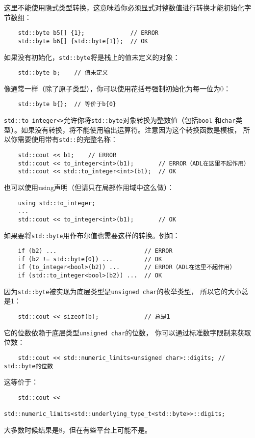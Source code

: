 这里不能使用隐式类型转换，这意味着你必须显式对整数值进行转换才能初始化字节数组：
\begin{lstlisting}
    std::byte b5[] {1};             // ERROR
    std::byte b6[] {std::byte{1}};  // OK
\end{lstlisting}
如果没有初始化，\texttt{std::byte}将是栈上的值未定义的对象：
\begin{lstlisting}
    std::byte b;    // 值未定义
\end{lstlisting}
像通常一样（除了原子类型），你可以使用花括号强制初始化为每一位为0：
\begin{lstlisting}
    std::byte b{};  // 等价于b{0}
\end{lstlisting}
\texttt{std::to\_integer<>}允许你将\texttt{std::byte}对象转换为整数值（包括\texttt{bool}
和\texttt{char}类型）。如果没有转换，将不能使用输出运算符。注意因为这个转换函数是模板，
所以你需要使用带有\texttt{std::}的完整名称：
\begin{lstlisting}
    std::cout << b1;    // ERROR
    std::cout << to_integer<int>(b1);       // ERROR（ADL在这里不起作用）
    std::cout << std::to_integer<int>(b1);  // OK
\end{lstlisting}
也可以使用using声明（但请只在局部作用域中这么做）：
\begin{lstlisting}
    using std::to_integer;
    ...
    std::cout << to_integer<int>(b1);       // OK
\end{lstlisting}
如果要将\texttt{std::byte}用作布尔值也需要这样的转换。例如：
\begin{lstlisting}
    if (b2) ...                         // ERROR
    if (b2 != std::byte{0}) ...         // OK
    if (to_integer<bool>(b2)) ...       // ERROR（ADL在这里不起作用）
    if (std::to_integer<bool>(b2)) ...  // OK
\end{lstlisting}
因为\texttt{std::byte}被实现为底层类型是\texttt{unsigned char}的枚举类型，
所以它的大小总是1：
\begin{lstlisting}
    std::cout << sizeof(b);             // 总是1
\end{lstlisting}
它的位数依赖于底层类型\texttt{unsigned char}的位数，
你可以通过标准数字限制来获取位数：
\begin{lstlisting}
    std::cout << std::numeric_limits<unsigned char>::digits; // std::byte的位数
\end{lstlisting}
这等价于：
\begin{lstlisting}
    std::cout <<
        std::numeric_limits<std::underlying_type_t<std::byte>>::digits;
\end{lstlisting}
大多数时候结果是8，但在有些平台上可能不是。

